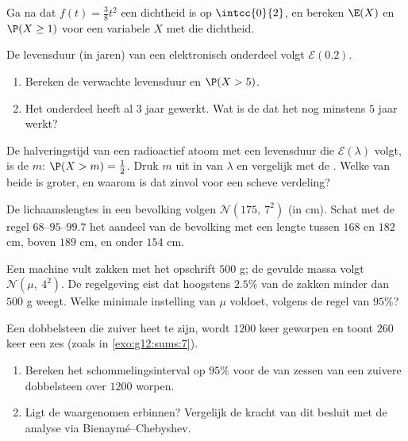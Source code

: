\begin{exercise}[$\star$]\label{exo:g12:contdist:2}
Ga na dat $f(t) = \frac{3}{8}t^2$ een dichtheid is op $\intcc{0}{2}$, en
bereken $\E(X)$ en $\P(X \geq 1)$ voor een variabele $X$ met die dichtheid.
\end{exercise}

\begin{exercise}[$\star$]\label{exo:g12:contdist:3}
De levensduur (in jaren) van een elektronisch onderdeel volgt
$\mathcal E(0.2)$.
\begin{enumerate}
  \item Bereken de verwachte levensduur en $\P(X > 5)$.
  \item Het onderdeel heeft al $3$ jaar gewerkt. Wat is de  dat het nog
        minstens $5$ jaar werkt?
\end{enumerate}
\end{exercise}

\begin{exercise}[$\star\star$]\label{exo:g12:contdist:4}
De halveringstijd van een radioactief atoom met een levensduur die
$\mathcal E(\lambda)$ volgt, is de  $m$: $\P(X > m) = \frac12$. Druk
$m$ uit in  van $\lambda$ en vergelijk met de . Welke
van beide is groter, en waarom is dat zinvol voor een scheve verdeling?
\end{exercise}

\begin{exercise}[$\star\star$]\label{exo:g12:contdist:5}
De lichaamslengtes in een bevolking volgen $\mathcal N(175,\ 7^2)$ (in cm).
Schat met de regel $68$--$95$--$99.7$ het aandeel van de bevolking met een
lengte tussen $168$ en $182$ cm, boven $189$ cm, en onder $154$ cm.
\end{exercise}

\begin{exercise}[$\star\star$]\label{exo:g12:contdist:6}
Een machine vult zakken met het opschrift $500$ g; de gevulde massa volgt
$\mathcal N(\mu,\ 4^2)$. De regelgeving eist dat hoogstens $2.5\%$ van de
zakken minder dan $500$ g weegt. Welke minimale instelling van $\mu$ voldoet,
volgens de regel van $95\%$?
\end{exercise}

\begin{exercise}[$\star\star$]\label{exo:g12:contdist:7}
Een dobbelsteen die zuiver heet te zijn, wordt $1200$ keer geworpen en toont
$260$ keer een zes (zoals in \cref{exo:g12:sums:7}).
\begin{enumerate}
  \item Bereken het schommelingsinterval op $95\%$ voor de  van
        zessen van een zuivere dobbelsteen over $1200$ worpen.
  \item Ligt de waargenomen  erbinnen? Vergelijk de kracht van dit
        besluit met de analyse via Bienaymé--Chebyshev.
\end{enumerate}
\end{exercise}

